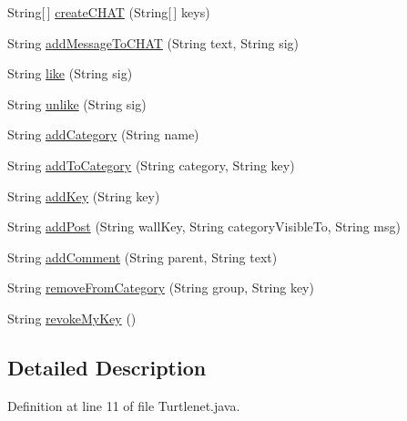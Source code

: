 \begin{DoxyCompactItemize}
\item 
String\mbox{[}$\,$\mbox{]} \hyperlink{interfaceballmerpeak_1_1turtlenet_1_1client_1_1Turtlenet_a73d0ea7f23c65c50b767ad11a15eb551}{create\-C\-H\-A\-T} (String\mbox{[}$\,$\mbox{]} keys)
\item 
String \hyperlink{interfaceballmerpeak_1_1turtlenet_1_1client_1_1Turtlenet_a21764196c7d0327729b959b3b989390f}{add\-Message\-To\-C\-H\-A\-T} (String text, String sig)
\item 
String \hyperlink{interfaceballmerpeak_1_1turtlenet_1_1client_1_1Turtlenet_a53b64b52b96b7867401e49a98ad3c56c}{like} (String sig)
\item 
String \hyperlink{interfaceballmerpeak_1_1turtlenet_1_1client_1_1Turtlenet_a06c7c35b8729183e426c463fbff37b6a}{unlike} (String sig)
\item 
String \hyperlink{interfaceballmerpeak_1_1turtlenet_1_1client_1_1Turtlenet_a2ef6a7f00e36033f8dc013f9a4de2dff}{add\-Category} (String name)
\item 
String \hyperlink{interfaceballmerpeak_1_1turtlenet_1_1client_1_1Turtlenet_ae9cd677b3fa8a8a9114297e58047abe3}{add\-To\-Category} (String category, String key)
\item 
String \hyperlink{interfaceballmerpeak_1_1turtlenet_1_1client_1_1Turtlenet_aefdafb728b08fcd230ed1ca26bf4ce9f}{add\-Key} (String key)
\item 
String \hyperlink{interfaceballmerpeak_1_1turtlenet_1_1client_1_1Turtlenet_a820a403aab7aeaa167cfef0f9a57c47e}{add\-Post} (String wall\-Key, String category\-Visible\-To, String msg)
\item 
String \hyperlink{interfaceballmerpeak_1_1turtlenet_1_1client_1_1Turtlenet_a5b9f57137f7abaca7713840d42918434}{add\-Comment} (String parent, String text)
\item 
String \hyperlink{interfaceballmerpeak_1_1turtlenet_1_1client_1_1Turtlenet_a3428354990f73f31969b9965ac84f279}{remove\-From\-Category} (String group, String key)
\item 
String \hyperlink{interfaceballmerpeak_1_1turtlenet_1_1client_1_1Turtlenet_a8630df1f1be5f09e7a258d2f8ab00feb}{revoke\-My\-Key} ()
\end{DoxyCompactItemize}


\subsection{Detailed Description}


Definition at line 11 of file Turtlenet.\-java.



